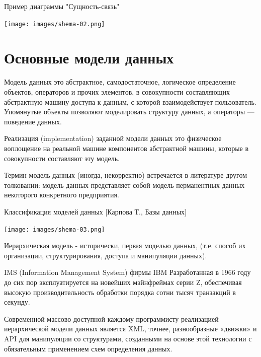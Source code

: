 \documentclass{beamer}
\begin{document}
\begin{frame}
\begin{block}{Пример диаграммы "Сущность-связь"}
\begin{center}
\texttt{[image: images/shema-02.png]}
\end{center}
\end{block}
\end{frame}

\section{Основные модели данных}

\begin{frame}
\begin{block}{Модель данных}
это абстрактное, самодостаточное, логическое определение объектов, операторов и прочих элементов, в совокупности составляющих абстрактную машину доступа к данным, с которой взаимодействует пользователь. Упомянутые объекты позволяют моделировать структуру данных, а операторы — поведение данных.
\end{block}
\begin{block}{Реализация (implementation) заданной модели данных}
это физическое воплощение на реальной машине компонентов абстрактной машины, которые в совокупности составляют эту модель.
\end{block}
Термин модель данных (иногда, некорректно) встречается в литературе другом толковании: модель данных представляет собой модель перманентных данных некоторого конкретного предприятия.
\end{frame}

\begin{frame}
\begin{block}{Классификация моделей данных [Карпова Т., Базы данных]}
\begin{center}
\texttt{[image: images/shema-03.png]}
\end{center}
\end{block}
\end{frame}

\begin{frame}
\begin{block}{Иерархическая модель}
- исторически, первая моделью данных, (т.е. способ их организации, структурирования, доступа и манипуляции данных).
\end{block}
IMS (Information Management System) фирмы IBM Разработанная в 1966 году до сих пор эксплуатируется на новейших мэйнфреймах серии Z, обеспечивая высокую производительность обработки порядка сотни тысяч транзакций в секунду.

Современной массово доступной каждому программисту реализацией иерархической модели данных является XML, точнее, разнообразные «движки» и API для манипуляции со структурами, созданными на основе этой технологии с обязательным применением схем определения данных.
\end{frame}
\end{document}

